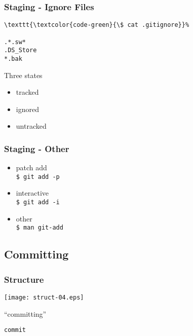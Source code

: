 \documentclass[english]{beamer}
\newcommand{\mysubsection}[2]{%
  \hypertarget{#2}{}%
  \subsection{#1}%
  \label{#2}%
}
\newcommand{\CMD}[1]{%
\texttt{\textcolor{code-green}{#1}}%
}
\begin{document}
\begin{frame}[fragile]
\frametitle{Staging - Ignore Files}

\begin{Verbatim}[commandchars=\\\{\}]
\CMD{\$ cat .gitignore}
.*.sw*
.DS_Store
*.bak
\end{Verbatim}

\vspace{.1\textheight}
Three states
    \begin{itemize}
            \item tracked \\
            \item ignored \\
            \item untracked \\
    \end{itemize}

\end{frame}
\begin{frame}[fragile]
\frametitle{Staging - Other}

\vspace{.1\textheight}

\begin{itemize}
        \item patch add \\
                \CMD{\$ git add -p}
                \vspace{.1\textheight}
        \item interactive\\
                \CMD{\$ git add -i}
                \vspace{.1\textheight}
        \item other\\
                \CMD{\$ man git-add}

\end{itemize}
\end{frame}

\mysubsection{Committing}{using:committing}
\begin{frame}
\frametitle{Structure}

\texttt{[image: struct-04.eps]}
\vspace{\baselineskip}
\begin{center}
        ``committing''

        \vspace{\baselineskip}
        \CMD{commit}
\end{center}
\vspace{\textheight}
\end{frame}
\end{document}
